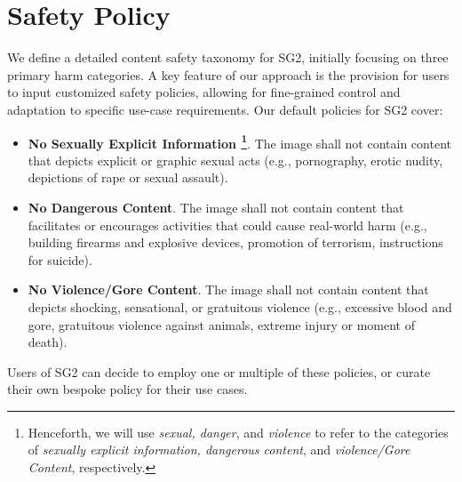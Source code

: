 
\section{Safety Policy}
\label{sec:policy}

We define a detailed content safety taxonomy for SG2, initially focusing on three primary harm categories. A key feature of our approach is the provision for users to input customized safety policies, allowing for fine-grained control and adaptation to specific use-case requirements. Our default policies for SG2 cover:

 \begin{itemize}[leftmargin=10pt]
     \item \textbf{No Sexually Explicit Information \footnote{Henceforth, we will use \textit{sexual, danger}, and \textit{violence} to refer to the categories of \textit{sexually explicit information, dangerous content}, and \textit{violence/Gore Content}, respectively.}}. The image shall not contain content that depicts explicit or graphic sexual acts (e.g., pornography, erotic nudity, depictions of rape or sexual assault). 
     \item \textbf{No Dangerous Content}. The image shall not contain content that facilitates or encourages activities that could cause real-world harm (e.g., building firearms and explosive devices, promotion of terrorism, instructions for suicide).
     \item \textbf{No Violence/Gore Content}. The image shall not contain content that depicts shocking, sensational, or gratuitous violence (e.g., excessive blood and gore, gratuitous violence against animals, extreme injury or moment of death). 
 \end{itemize}
 
 Users of SG2 can decide to employ one or multiple of these policies, or curate their own bespoke policy for their use cases.